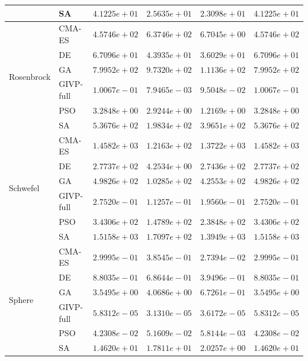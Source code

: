 \begin{table}[htb]
\begin{tabular}{llrrrr}
   & SA & $4.1225e+01$ & $2.5635e+01$ & $2.3098e+01$ & $4.1225e+01$ \\
\midrule
  \multirow{6}{*}{Rosenbrock} & CMA-ES & $4.5746e+02$ & $6.3746e+02$ & $6.7045e+00$ & $4.5746e+02$ \\
   & DE & $6.7096e+01$ & $4.3935e+01$ & $3.6029e+01$ & $6.7096e+01$ \\
   & GA & $7.9952e+02$ & $9.7320e+02$ & $1.1136e+02$ & $7.9952e+02$ \\
   & GIVP-full & $1.0067e-01$ & $7.9465e-03$ & $9.5048e-02$ & $1.0067e-01$ \\
   & PSO & $3.2848e+00$ & $2.9244e+00$ & $1.2169e+00$ & $3.2848e+00$ \\
   & SA & $5.3676e+02$ & $1.9834e+02$ & $3.9651e+02$ & $5.3676e+02$ \\
\midrule
  \multirow{6}{*}{Schwefel} & CMA-ES & $1.4582e+03$ & $1.2163e+02$ & $1.3722e+03$ & $1.4582e+03$ \\
   & DE & $2.7737e+02$ & $4.2534e+00$ & $2.7436e+02$ & $2.7737e+02$ \\
   & GA & $4.9826e+02$ & $1.0285e+02$ & $4.2553e+02$ & $4.9826e+02$ \\
   & GIVP-full & $2.7520e-01$ & $1.1257e-01$ & $1.9560e-01$ & $2.7520e-01$ \\
   & PSO & $3.4306e+02$ & $1.4789e+02$ & $2.3848e+02$ & $3.4306e+02$ \\
   & SA & $1.5158e+03$ & $1.7097e+02$ & $1.3949e+03$ & $1.5158e+03$ \\
\midrule
  \multirow{6}{*}{Sphere} & CMA-ES & $2.9995e-01$ & $3.8545e-01$ & $2.7394e-02$ & $2.9995e-01$ \\
   & DE & $8.8035e-01$ & $6.8644e-01$ & $3.9496e-01$ & $8.8035e-01$ \\
   & GA & $3.5495e+00$ & $4.0686e+00$ & $6.7261e-01$ & $3.5495e+00$ \\
   & GIVP-full & $5.8312e-05$ & $3.1310e-05$ & $3.6172e-05$ & $5.8312e-05$ \\
   & PSO & $4.2308e-02$ & $5.1609e-02$ & $5.8144e-03$ & $4.2308e-02$ \\
   & SA & $1.4620e+01$ & $1.7811e+01$ & $2.0257e+00$ & $1.4620e+01$ \\
\bottomrule
\end{tabular}


\end{table}
